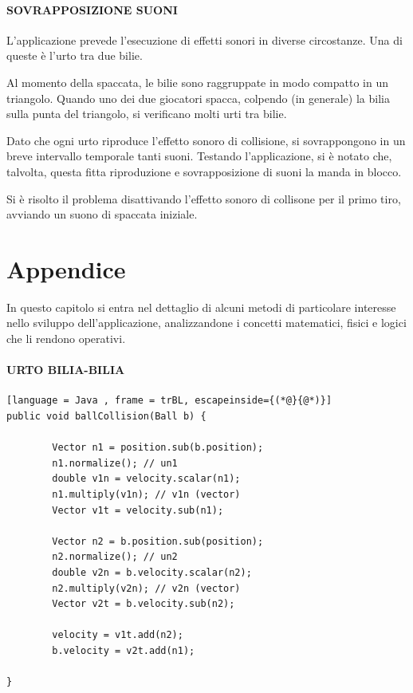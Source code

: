 \documentclass[12pt,a4paper]{report}
\begin{document}
\subsubsection*{SOVRAPPOSIZIONE SUONI}
L'applicazione prevede l'esecuzione di effetti sonori in diverse circostanze. Una di queste è l'urto tra due bilie.

\vspace{3mm}

Al momento della spaccata, le bilie sono raggruppate in modo compatto in un triangolo. Quando uno dei due giocatori spacca, colpendo (in generale) la bilia sulla punta del triangolo, si verificano molti urti tra bilie.

Dato che ogni urto riproduce l'effetto sonoro di collisione, si sovrappongono in un breve intervallo temporale tanti suoni.
Testando l'applicazione, si è notato che, talvolta, questa fitta riproduzione e sovrapposizione di suoni la manda in blocco.

\vspace{3mm}

Si è risolto il problema disattivando l'effetto sonoro di collisone per il primo tiro, avviando un suono di spaccata iniziale.

\chapter{Appendice} \label{ch:Appendix} %
In questo capitolo si entra nel dettaglio di alcuni metodi di particolare interesse nello sviluppo dell'applicazione, analizzandone i concetti matematici, fisici e logici che li rendono operativi.

\subsubsection*{URTO BILIA-BILIA}

\begin{lstlisting}[language = Java , frame = trBL, escapeinside={(*@}{@*)}]
public void ballCollision(Ball b) {

        Vector n1 = position.sub(b.position);
        n1.normalize(); // un1
        double v1n = velocity.scalar(n1);
        n1.multiply(v1n); // v1n (vector)
        Vector v1t = velocity.sub(n1);

        Vector n2 = b.position.sub(position);
        n2.normalize(); // un2
        double v2n = b.velocity.scalar(n2);
        n2.multiply(v2n); // v2n (vector)
        Vector v2t = b.velocity.sub(n2);
        
        velocity = v1t.add(n2);
        b.velocity = v2t.add(n1);
        
}
\end{lstlisting}
\end{document}
